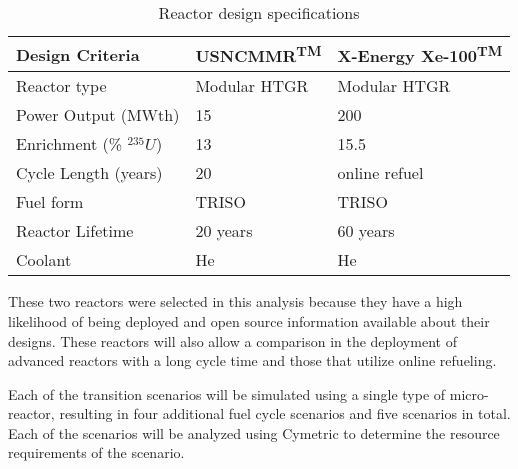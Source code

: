 \begin{table}
    \caption{Reactor design specifications}
    \label{tab:reactor_summary}
    \begin{tabular}{|p{2.5cm}|p{2.25cm}|p{2.5cm}|}
        \hline
        Design Criteria & \gls{USNC}\gls{MMR}\textsuperscript{TM} & 
            X-Energy Xe-100\textsuperscript{TM} \\\hline
        Reactor type & Modular HTGR & Modular HTGR \\
        Power Output (MWth) & 15 & 200 \\
        Enrichment (\% $^{235}U$) & 13 & 15.5 \\
        Cycle Length (years) & 20 & online refuel\\
        Fuel form & \gls{TRISO} & \gls{TRISO} \\
        Reactor Lifetime & 20 years & 60 years \\
        Coolant & He & He \\
        \hline
    \end{tabular}
\end{table}
    
These two reactors were selected in this analysis because they have a high 
likelihood of being deployed and open source information available about 
their designs. These reactors will also allow a comparison in the 
deployment of advanced reactors with a long cycle time and those that 
utilize online refueling. 

Each of the transition scenarios will be simulated using a single type of 
micro-reactor, resulting in four additional fuel cycle scenarios and five 
scenarios in total. Each of the scenarios will be analyzed using Cymetric
\cite{scopatz_cymetric_2015} to determine the resource requirements of the 
scenario. 